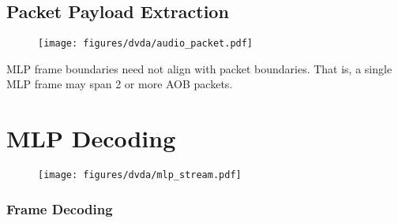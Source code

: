\clearpage

\subsection{Packet Payload Extraction}

\begin{figure}[h]
  \texttt{[image: figures/dvda/audio\_packet.pdf]}
\end{figure}
\par
\noindent
MLP frame boundaries need not align with packet boundaries.
That is, a single MLP frame may span 2 or more AOB packets.

\clearpage

\section{MLP Decoding}
{
  
}

\begin{figure}[h]
  \texttt{[image: figures/dvda/mlp\_stream.pdf]}
\end{figure}

\clearpage

\subsubsection{Frame Decoding}
\label{mlp:framedecoding}
{
  
}

\clearpage

